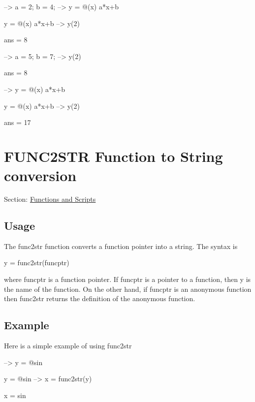 \begin{DoxyVerbInclude}
--> a = 2; b = 4;    %
--> y = @(x) a*x+b   %

y = 
 @(x)   a*x+b   %
--> y(2)             %

ans = 
 8 

--> a = 5; b = 7;    %
--> y(2)             %

ans = 
 8 

--> y = @(x) a*x+b   %

y = 
 @(x)   a*x+b   %
--> y(2)             %

ans = 
 17 
\end{DoxyVerbInclude}
 \hypertarget{functions_func2str}{}\section{F\-U\-N\-C2\-S\-T\-R Function to String conversion}\label{functions_func2str}
Section\-: \hyperlink{sec_functions}{Functions and Scripts} \hypertarget{vtkwidgets_vtkxyplotwidget_Usage}{}\subsection{Usage}\label{vtkwidgets_vtkxyplotwidget_Usage}
The {\ttfamily func2str} function converts a function pointer into a string. The syntax is \begin{DoxyVerb}    y = func2str(funcptr)
\end{DoxyVerb}
 where {\ttfamily funcptr} is a function pointer. If {\ttfamily funcptr} is a pointer to a function, then {\ttfamily y} is the name of the function. On the other hand, if {\ttfamily funcptr} is an anonymous function then {\ttfamily func2str} returns the definition of the anonymous function. \hypertarget{variables_struct_Example}{}\subsection{Example}\label{variables_struct_Example}
Here is a simple example of using {\ttfamily func2str}


\begin{DoxyVerbInclude}
--> y = @sin

y = 
 @sin
--> x = func2str(y)

x = 
sin
\end{DoxyVerbInclude}


